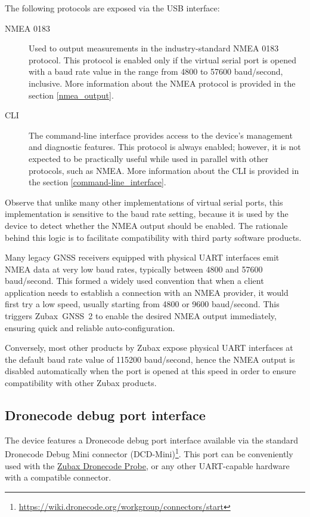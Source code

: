 \documentclass{zubaxdoc}
\begin{document}
The following protocols are exposed via the USB interface:
\begin{description}

    \item[NMEA 0183] Used to output measurements in the industry-standard NMEA 0183 protocol.
    This protocol is enabled only if the virtual serial port is opened with a baud rate value in the
    range from 4800 to 57600 baud/second, inclusive.
    More information about the NMEA protocol is provided in the section \ref{nmea_output}.

    \item[CLI] The command-line interface provides access to the device's management and diagnostic
    features. This protocol is always enabled; however, it is not expected to be practically useful
    while used in parallel with other protocols, such as NMEA.
    More information about the CLI is provided in the section \ref{command-line_interface}.

\end{description}

Observe that unlike many other implementations of virtual serial ports,
this implementation is sensitive to the baud rate setting,
because it is used by the device to detect whether the NMEA output should be enabled.
The rationale behind this logic is to facilitate compatibility with third party software products.

Many legacy GNSS receivers equipped with physical UART interfaces emit NMEA data at very low
baud rates, typically between 4800 and 57600 baud/second.
This formed a widely used convention that when a client application needs to establish a connection
with an NMEA provider, it would first try a low speed, usually starting from 4800 or 9600
baud/second.
This triggers Zubax~GNSS~2 to enable the desired NMEA output immediately,
ensuring quick and reliable auto-configuration.

Conversely, most other products by Zubax expose physical UART interfaces at the default baud rate
value of 115200 baud/second, hence the NMEA output is disabled automatically when the port is opened at
this speed in order to ensure compatibility with other Zubax products.

\subsection{Dronecode debug port interface}

The device features a Dronecode debug port interface available via the standard
Dronecode Debug Mini connector (DCD-Mini)\footnote{\url{https://wiki.dronecode.org/workgroup/connectors/start}}.
This port can be conveniently used with the \href{https://kb.zubax.com/x/iIAh}{Zubax Dronecode Probe},
or any other UART-capable hardware with a compatible connector.
\end{document}
